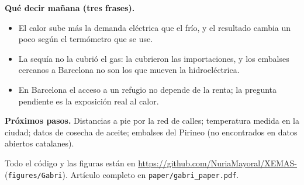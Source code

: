 \documentclass[10pt,a4paper]{article}
\begin{document}
\normalsize
\smallskip
\textbf{Qu\'e decir ma\~nana (tres frases).}
\begin{itemize}\setlength{\itemsep}{0pt}\setlength{\topsep}{2pt}
\item El calor sube m\'as la demanda el\'ectrica que el fr\'io, y el resultado cambia un poco seg\'un el term\'ometro que se use.
\item La sequ\'ia no la cubri\'o el gas: la cubrieron las importaciones, y los embalses cercanos a Barcelona no son los que mueven la hidroel\'ectrica.
\item En Barcelona el acceso a un refugio no depende de la renta; la pregunta pendiente es la exposici\'on real al calor.
\end{itemize}
\textbf{Pr\'oximos pasos.} Distancias a pie por la red de calles; temperatura medida en la ciudad; datos de cosecha de aceite; embalses del Pirineo (no encontrados en datos abiertos catalanes).

{\footnotesize\raggedright Todo el c\'odigo y las figuras est\'an en \url{https://github.com/NuriaMayoral/XEMAS-} (\texttt{figures/Gabri}). Art\'iculo completo en \texttt{paper/gabri\_paper.pdf}.\par}
\end{document}

